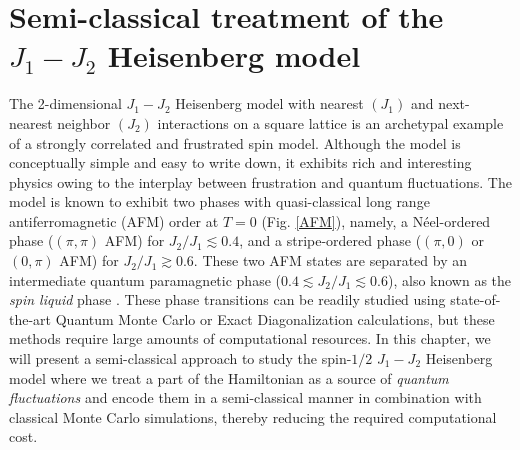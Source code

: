 \documentclass[../thesis_main.tex]{subfiles}
\begin{document}
\chapter{Semi-classical treatment of the $J_1 - J_2$ Heisenberg model}
The 2-dimensional $J_1 - J_2$ Heisenberg model with nearest $(J_1)$ and next-nearest neighbor $(J_2)$ interactions on a square lattice is an archetypal example of a strongly correlated and frustrated spin model. Although the model is conceptually simple and easy to write down, it exhibits rich and interesting physics owing to the interplay between frustration and quantum fluctuations. The model is known to exhibit two phases with quasi-classical long range antiferromagnetic (AFM) order at $T = 0$ (Fig. \ref{AFM}), namely, a Néel-ordered phase ($(\pi,\pi)$ AFM) for $J_2/J_1 \lesssim 0.4$, and a stripe-ordered phase ($(\pi, 0)$ or $(0, \pi)$ AFM) for $J_2/J_1 \gtrsim 0.6$. These two AFM states are separated by an intermediate quantum paramagnetic phase ($0.4 \lesssim J_2/J_1 \lesssim 0.6$), also known as the \textit{spin liquid} phase \cite{Li_2014}. These phase transitions can be readily studied using state-of-the-art Quantum Monte Carlo or Exact Diagonalization calculations, but these methods require large amounts of computational resources. In this chapter, we will present a semi-classical approach to study the spin-$1/2$ $J_1-J_2$ Heisenberg model where we treat a part of the Hamiltonian as a source of \textit{quantum fluctuations} and encode them in a semi-classical manner in combination with classical Monte Carlo simulations, thereby reducing the required computational cost.
\end{document}

